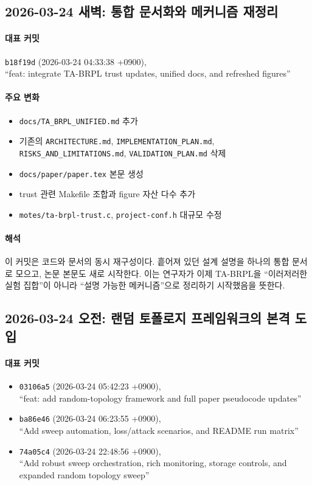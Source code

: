 \documentclass[12pt,a4paper]{article}
\begin{document}
\subsection{2026-03-24 새벽: 통합 문서화와 메커니즘 재정리}

\paragraph{대표 커밋}
\texttt{b18f19d} (2026-03-24 04:33:38 +0900),\\
``feat: integrate TA-BRPL trust updates, unified docs, and refreshed figures''

\paragraph{주요 변화}
\begin{itemize}[leftmargin=1.5em]
\item \texttt{docs/TA\_BRPL\_UNIFIED.md} 추가
\item 기존의 \texttt{ARCHITECTURE.md}, \texttt{IMPLEMENTATION\_PLAN.md},
\texttt{RISKS\_AND\_LIMITATIONS.md}, \texttt{VALIDATION\_PLAN.md} 삭제
\item \texttt{docs/paper/paper.tex} 본문 생성
\item trust 관련 Makefile 조합과 figure 자산 다수 추가
\item \texttt{motes/ta-brpl-trust.c}, \texttt{project-conf.h} 대규모 수정
\end{itemize}

\paragraph{해석}
이 커밋은 코드와 문서의 동시 재구성이다. 흩어져 있던 설계 설명을 하나의 통합 문서로
모으고, 논문 본문도 새로 시작한다. 이는 연구자가 이제 TA-BRPL을
``이러저러한 실험 집합''이 아니라 ``설명 가능한 메커니즘''으로 정리하기 시작했음을 뜻한다.

\subsection{2026-03-24 오전: 랜덤 토폴로지 프레임워크의 본격 도입}

\paragraph{대표 커밋}
\begin{itemize}[leftmargin=1.5em]
\item \texttt{03106a5} (2026-03-24 05:42:23 +0900),\\
``feat: add random-topology framework and full paper pseudocode updates''
\item \texttt{ba86e46} (2026-03-24 06:23:55 +0900),\\
``Add sweep automation, loss/attack scenarios, and README run matrix''
\item \texttt{74a05c4} (2026-03-24 22:48:56 +0900),\\
``Add robust sweep orchestration, rich monitoring, storage controls, and expanded random topology sweep''
\end{itemize}
\end{document}
